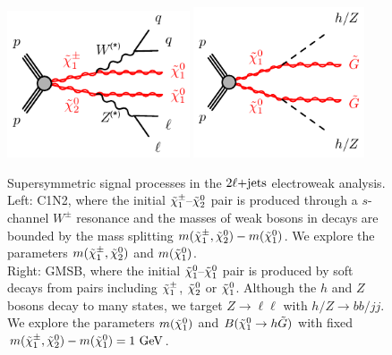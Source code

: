 \begin{figure}[t]
\centering
\includegraphics[width=0.48\textwidth]{figures/2ljets_c1n2_llqqn1n1_wz.pdf}
\quad
\includegraphics[width=0.45\textwidth]{figures/2ljets_n1n1_hhggzz.pdf}
\caption{%
Supersymmetric signal processes in the $\twoljets$ electroweak analysis.
\\[0.5em]
Left: C1N2, where the initial $\chargino{1}\textrm{--}\neutralino{2}$ pair
is produced through a $s$-channel $W^{\pm}$ resonance and the masses of
weak bosons in decays are bounded by the mass splitting
$m(\chargino{1}, \neutralino{2}) - m(\neutralino{1})$.
We explore the parameters
$m(\chargino{1}, \neutralino{2})$ and $m(\neutralino{1})$.
\\[0.5em]
Right: GMSB, where the initial $\neutralino{1}\textrm{--}\neutralino{1}$ pair
is produced by soft decays from pairs including $\chargino{1}$,
$\neutralino{2}$ or $\neutralino{1}$.
Although the $h$ and $Z$ bosons decay to many states, we target
$Z\rightarrow \ell\ell$ with
$h/Z\rightarrow bb/jj$.
We explore the parameters
$m(\neutralino{1})$ and $B(\neutralino{1} \rightarrow h \tilde{G})$ with fixed
$m(\chargino{1}, \neutralino{2}) - m(\neutralino{1}) = 1~\eV[G]$.
}
\label{fig:2ljets_summary}
\end{figure}





